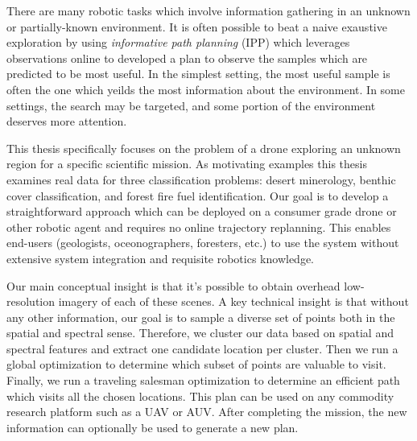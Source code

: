 
\setlength{\parskip}{1em}
\setlength{\parindent}{0em}

\noindent
There are many robotic tasks which involve information gathering in an unknown or partially-known environment. It is often possible to beat a naive exaustive exploration by using \textit{informative path planning} (IPP) which leverages observations online to developed a plan to observe the samples which are predicted to be most useful. In the simplest setting, the most useful sample is often the one which yeilds the most information about the environment. In some settings, the search may be targeted, and some portion of the environment deserves more attention.

This thesis specifically focuses on the problem of a drone exploring an unknown region for a specific scientific mission. As motivating examples this thesis examines real data for three classification problems: desert minerology, benthic cover classification, and forest fire fuel identification. Our goal is to develop a straightforward approach which can be deployed on a consumer grade drone or other robotic agent and requires no online trajectory replanning. This enables end-users (geologists, oceonographers, foresters, etc.) to use the system without extensive system integration and requisite robotics knowledge. 

Our main conceptual insight is that it's possible to obtain overhead low-resolution imagery of each of these scenes. A key technical insight is that without any other information, our goal is to sample a diverse set of points both in the spatial and spectral sense. Therefore, we cluster our data based on spatial and spectral features and extract one candidate location per cluster. Then we run a global optimization to determine which subset of points are valuable to visit. Finally, we run a traveling salesman optimization to determine an efficient path which visits all the chosen locations. This plan can be used on any commodity research platform such as a UAV or AUV. After completing the mission, the new information can optionally be used to generate a new plan.